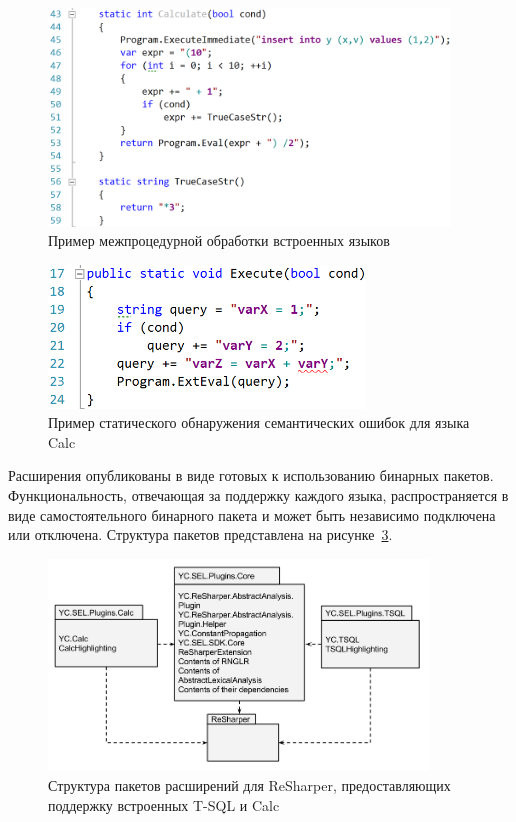 \begin{figure}[H]
  \centering
 \includegraphics[width=0.95\textwidth]{pics/sql_calc_cycle.png}
 \caption{Пример межпроцедурной обработки встроенных языков}
 \label{fig:interProc}
\end{figure}

\begin{figure}[H]
  \centering
 \includegraphics[width=0.75\textwidth]{pics/undefined_variable.png}
 \caption{Пример статического обнаружения семантических ошибок для языка Calc}
 \label{fig:undeclaredVars}
\end{figure}

Расширения опубликованы в виде готовых к использованию бинарных пакетов. Функциональность, отвечающая за поддержку каждого языка, распространяется в виде самостоятельного бинарного пакета и может быть независимо подключена или отключена. Структура пакетов представлена на рисунке~\ref{fig:packagesStructure}.

\begin{figure}[H]
  \centering
 \includegraphics[width=0.90\textwidth]{pics/RshPluginsPackages.png}
 \caption{Структура пакетов расширений для ReSharper, предоставляющих поддержку встроенных T-SQL и Calc}
 \label{fig:packagesStructure}
\end{figure}

